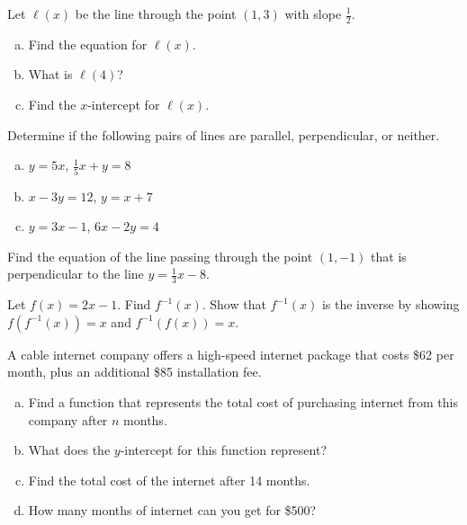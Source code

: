 \documentclass[11pt,letterpaper]{article}
\begin{document}
\newpage





 Let $\ell(x)$ be the line through the point $(1, 3)$ with slope $\frac{1}{2}$.
	\begin{enumerate}[(a)]
	\item Find the equation for $\ell(x)$. 
	\item What is $\ell(4)$?
	\item Find the $x$-intercept for $\ell(x)$. 
	\end{enumerate}





\newpage





 Determine if the following pairs of lines are parallel, perpendicular, or neither.
	\begin{enumerate}[(a)]
	\item $y= 5x$, \enskip $\frac{1}{5}x + y= 8$
	\item $x - 3y= 12$, \enskip $y= x + 7$
	\item $y= 3x - 1$, \enskip $6x - 2y= 4$
	\end{enumerate}





\newpage





 Find the equation of the line passing through the point $(1, -1)$ that is perpendicular to the line $y= \frac{1}{3} x - 8$. 





\newpage





 Let $f(x)= 2x - 1$. Find $f^{-1}(x)$. Show that $f^{-1}(x)$ is the inverse by showing $f(f^{-1}(x))= x$ and $f^{-1}(f(x))= x$. 





\newpage





 A cable internet company offers a high-speed internet package that costs \$62 per month, plus an additional \$85 installation fee. 
	\begin{enumerate}[(a)]
	\item Find a function that represents the total cost of purchasing internet from this company after $n$ months. 
	\item What does the $y$-intercept for this function represent?
	\item Find the total cost of the internet after 14 months.
	\item How many months of internet can you get for \$500?
	\end{enumerate}


\end{document}
